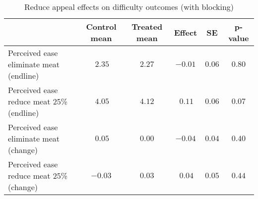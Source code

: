 \begin{table*}[ht]
\caption{Reduce appeal effects on difficulty outcomes (with blocking)\label{round}} 
\begin{center}
\begin{tabular}{lccccc}
\hline\hline
\multicolumn{1}{l}{}&\multicolumn{1}{c}{Control mean}&\multicolumn{1}{c}{Treated mean}&\multicolumn{1}{c}{Effect}&\multicolumn{1}{c}{SE}&\multicolumn{1}{c}{p-value}\tabularnewline
\hline
Perceived ease eliminate meat (endline)&$~2.35$&$2.27$&$-0.01$&$0.06$&$0.80$\tabularnewline
Perceived ease reduce meat 25\% (endline)&$~4.05$&$4.12$&$~0.11$&$0.06$&$0.07$\tabularnewline
Perceived ease eliminate meat (change)&$~0.05$&$0.00$&$-0.04$&$0.04$&$0.40$\tabularnewline
Perceived ease reduce meat 25\% (change)&$-0.03$&$0.03$&$~0.04$&$0.05$&$0.44$\tabularnewline
\hline
\end{tabular}\end{center}

\end{table*}
